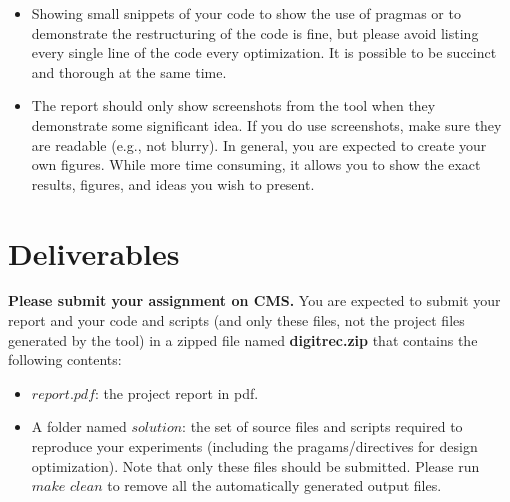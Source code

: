 \documentclass[paper=letter, fontsize=10pt]{scrartcl} %
\numberwithin{equation}{section} %
\numberwithin{figure}{section} %
\numberwithin{table}{section} %
\begin{document}
\begin{itemize}

\item Showing small snippets of your code to show the use of pragmas or to demonstrate the restructuring of the code is fine, but please avoid listing every single line of the code every optimization. It is possible to be succinct and thorough at the same time.

\item The report should only show screenshots from the tool when they demonstrate some significant idea. If you do use screenshots, make sure they are readable (e.g., not blurry). In general, you are expected to create your own figures. While more time consuming, it allows you to show the exact results, figures, and ideas you wish to present.

\end{itemize}

\section{Deliverables}
\label{deliverables}
\textbf{Please submit your assignment on CMS.} You are expected to submit your report and your code and scripts (and only these files, not the project files generated by the tool) in a zipped file named \textbf{digitrec.zip} that contains the following contents:
\begin{itemize}
	\item $report.pdf$: the project report in pdf.
    \item A folder named $solution$: the set of source files and scripts required to reproduce your experiments (including the pragams/directives for design optimization).  
    Note that only these files should be submitted. Please run $make$ $clean$ to remove all the automatically generated output files. 
\end{itemize}
\end{document}
